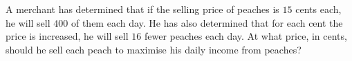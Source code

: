 A merchant has determined that if the selling price of peaches is $15$ cents each, he will sell $400$ of them each day. He has also determined that for each cent the price is increased, he will sell $16$ fewer peaches each day. At what price, in cents, should he sell each peach to maximise his daily income from peaches?
